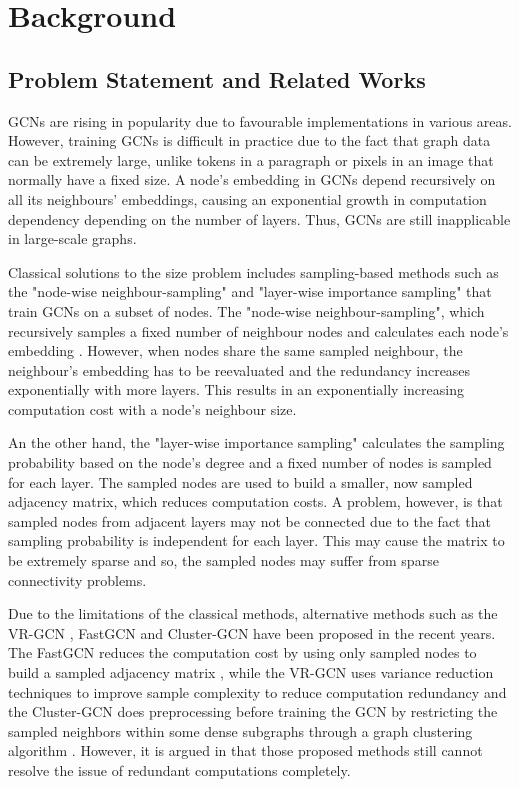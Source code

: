 \chapter{Background}

\section{Problem Statement and Related Works}
GCNs are rising in popularity due to favourable implementations in various areas. However, training GCNs is difficult in practice due to the fact that graph data can be extremely large, unlike tokens in a paragraph or pixels in an image that normally have a fixed size. A node's embedding in GCNs depend recursively on all its neighbours' embeddings, causing an exponential growth in computation dependency depending on the number of layers. Thus, GCNs are still inapplicable in large-scale graphs.

Classical solutions to the size problem includes sampling-based methods such as the "node-wise neighbour-sampling" and "layer-wise importance sampling" that train GCNs on a subset of nodes. The "node-wise neighbour-sampling", which recursively samples a fixed number of neighbour nodes and calculates each node's embedding \cite{assigned_paper_zou2019layer}. However, when nodes share the same sampled neighbour, the neighbour's embedding has to be reevaluated and the redundancy increases exponentially with more layers. This results in an exponentially increasing computation cost with a node's neighbour size.

An the other hand, the "layer-wise importance sampling" calculates the sampling probability based on the node's degree and a fixed number of nodes is sampled for each layer. The sampled nodes are used to build a smaller, now sampled adjacency matrix, which reduces computation costs. A problem, however, is that sampled nodes from adjacent layers may not be connected due to the fact that sampling probability is independent for each layer. This may cause the matrix to be extremely sparse and so, the sampled nodes may suffer from sparse connectivity problems.

Due to the limitations of the classical methods, alternative methods such as the VR-GCN \cite{chen2017stochastic}, FastGCN \cite{chen2018fastgcn} and Cluster-GCN \cite{chiang2019cluster} have been proposed in the recent years. The FastGCN reduces the computation cost by using only sampled nodes to build a sampled adjacency matrix \cite{chen2018fastgcn}, while the VR-GCN uses variance
reduction techniques to improve sample complexity to reduce computation redundancy \cite{chen2017stochastic} and the Cluster-GCN does preprocessing before training the GCN by restricting the sampled neighbors within some dense subgraphs through a graph clustering algorithm \cite{chiang2019cluster}. However, it is argued in \cite{assigned_paper_zou2019layer} that those proposed methods still cannot resolve the issue of redundant
computations completely.


